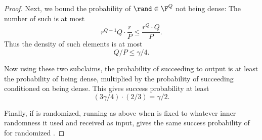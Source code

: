 \documentclass[11pt]{article}
\numberwithin{equation}{section} %
\numberwithin{figure}{section} %
\begin{document}
\begin{proof}
  
  Next, we bound the probability of $\rand\in \F^Q$ not being dense:
  The number of such \rand is at most
  \[ r^{Q-1}Q \cdot \frac{r}{P}\leq \frac{r^Q\cdot Q}{P}.\]
  Thus the density of such elements is at most
  \[Q/P\leq \gamma/4.\]
  
  Now using these two subclaims, the probability of \ext succeeding to output \sk is at least the probability of \rand being dense, multiplied by the probability of \ext succeeding conditioned on \rand being dense. This gives success probability at least
  \[(3\gamma/4)\cdot (2/3) = \gamma/2.\]  
  
  
  Finally, if \adv is randomized, running \ext as above when \adv is fixed to whatever inner randomness it used and \ext received as input, gives the same success probability of \ext for randomized \adv.
  
  \end{proof}
\end{document}
